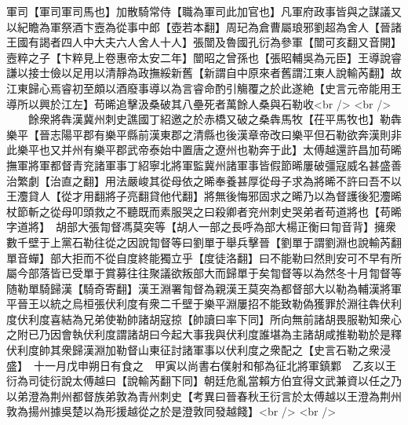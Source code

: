 軍司【軍司軍司馬也】加散騎常侍【職為軍司此加官也】凡軍府政事皆與之謀議又以紀瞻為軍祭酒卞壼為從事中郎【壺若本翻】周玘為倉曹屬琅邪劉超為舍人【晉諸王國有謁者四人中大夫六人舍人十人】張闓及魯國孔衍為參軍【闓可亥翻又音開】壼粹之子【卞粹見上卷惠帝太安二年】闓昭之曾孫也【張昭輔吳為元臣】王導說睿謙以接士儉以足用以清靜為政撫綏新舊【新謂自中原來者舊謂江東人說輸芮翻】故江東歸心焉睿初至頗以酒廢事導以為言睿命酌引觴覆之於此遂絶【史言元帝能用王導所以興於江左】苟晞追擊汲桑破其八壘死者萬餘人桑與石勒收<br />
<br />
　　餘衆將犇漢冀州刺史譙國丁紹邀之於赤橋又破之桑犇馬牧【茌平馬牧也】勒犇樂平【晉志陽平郡有樂平縣前漢東郡之清縣也後漢章帝改曰樂平但石勒欲奔漢則非此樂平也又并州有樂平郡武帝泰始中置唐之遼州也勒奔于此】太傅越還許昌加苟晞撫軍將軍都督青兖諸軍事丁紹寧北將軍監冀州諸軍事皆假節晞屢破彊寇威名甚盛善治繁劇【治直之翻】用法嚴峻其從母依之晞奉養甚厚從母子求為將晞不許曰吾不以王灋貸人【從才用翻將子亮翻貸他代翻】將無後悔邪固求之晞乃以為督護後犯灋晞杖節斬之從母叩頭救之不聽既而素服哭之曰殺卿者兖州刺史哭弟者苟道將也【苟晞字道將】　胡部大張㔨督馮莫突等【胡人一部之長呼為部大楊正衡曰㔨音背】擁衆數千壁于上黨石勒往從之因說㔨督等曰劉單于舉兵擊晉【劉單于謂劉淵也說輸芮翻單音蟬】部大拒而不從自度終能獨立乎【度徒洛翻】曰不能勒曰然則安可不早有所屬今部落皆已受單于賞募往往聚議欲叛部大而歸單于矣㔨督等以為然冬十月㔨督等随勒單騎歸漢【騎奇寄翻】漢王淵署㔨督為親漢王莫突為都督部大以勒為輔漢將軍平晉王以統之烏桓張伏利度有衆二千壁于樂平淵屢招不能致勒偽獲罪於淵往犇伏利度伏利度喜結為兄弟使勒帥諸胡寇掠【帥讀曰率下同】所向無前諸胡畏服勒知衆心之附已乃因會執伏利度謂諸胡曰今起大事我與伏利度誰堪為主諸胡咸推勒勒於是釋伏利度帥其衆歸漢淵加勒督山東征討諸軍事以伏利度之衆配之【史言石勒之衆浸盛】　十一月戊申朔日有食之　甲寅以尚書右僕射和郁為征北將軍鎮鄴　乙亥以王衍為司徒衍說太傅越曰【說輸芮翻下同】朝廷危亂當賴方伯宜得文武兼資以任之乃以弟澄為荆州都督族弟敦為青州刺史【考異曰晉春秋王衍言於太傅越以王澄為荆州敦為揚州據吳楚以為形援越從之於是澄敦同發越餞】<br />
<br />
